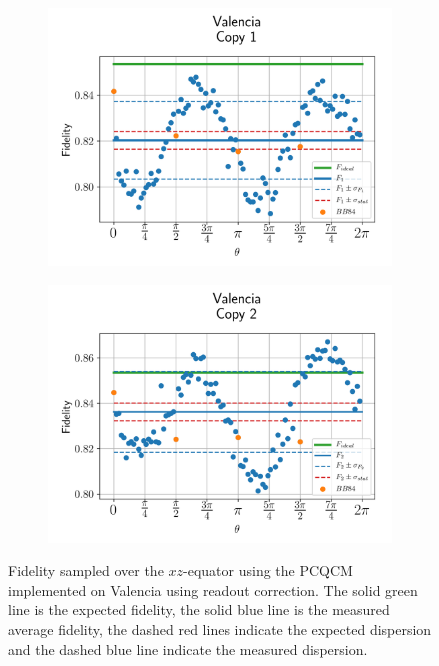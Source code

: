   
  \begin{figure}[H]
    \centering
    \begin{subfigure}{.5\textwidth}
      \centering
      \includegraphics[width=\textwidth]{Figures/PhaseCovariant/IBM/OnlyEquator/results_valencia_copy1.png}
      \label{fig:pc_uncorrected_valencia_equator_1}
    \end{subfigure}%
    \begin{subfigure}{.5\textwidth}
      \centering
      \includegraphics[width=\textwidth]{Figures/PhaseCovariant/IBM/OnlyEquator/results_valencia_copy2.png}
      \label{fig:pc_uncorrected_valencia_equator_2}
    \end{subfigure}
    \vspace{-0.5cm}
    \caption{Fidelity sampled over the $xz$-equator using the PCQCM implemented on Valencia using readout correction. The solid green line is the expected fidelity, the solid blue line is the measured average fidelity, the dashed red lines indicate the expected dispersion and the dashed blue line indicate the measured dispersion.}
    \label{fig:pc_uncorrected_valencia_equator}
  \end{figure}
  

